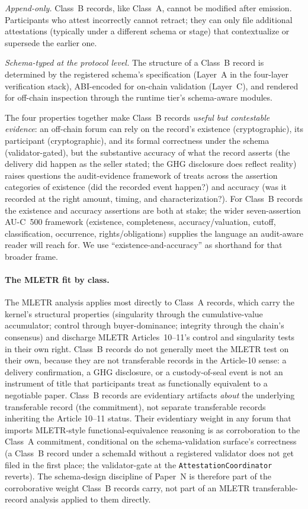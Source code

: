 \documentclass[11pt,a4paper]{article}
\theoremstyle{remark}
\begin{document}
\emph{Append-only.} Class~B records, like Class~A, cannot be
modified after emission. Participants who attest incorrectly
cannot retract; they can only file additional attestations
(typically under a different schema or stage) that contextualize
or supersede the earlier one.

\emph{Schema-typed at the protocol level.} The structure of a
Class~B record is determined by the registered schema's
specification (Layer~A in the four-layer verification stack),
ABI-encoded for on-chain validation (Layer~C), and rendered for
off-chain inspection through the runtime tier's schema-aware
modules.

The four properties together make Class~B records \emph{useful
but contestable evidence}: an off-chain forum can rely on the
record's existence (cryptographic), its participant
(cryptographic), and its formal correctness under the schema
(validator-gated), but the substantive accuracy of what the
record asserts (the delivery did happen as the seller stated;
the GHG disclosure does reflect reality) raises questions the
audit-evidence framework of \citet{aicpa2020auc500} treats
across the assertion categories of existence (did the recorded
event happen?) and accuracy (was it recorded at the right
amount, timing, and characterization?). For Class~B records the
existence and accuracy assertions are both at stake; the wider
seven-assertion AU-C~500 framework (existence, completeness,
accuracy/valuation, cutoff, classification, occurrence,
rights/obligations) supplies the language an audit-aware reader
will reach for. We use ``existence-and-accuracy'' as shorthand
for that broader frame.

\paragraph{The MLETR fit by class.}
The MLETR analysis applies most directly to Class~A records,
which carry the kernel's structural properties (singularity
through the cumulative-value accumulator; control through
buyer-dominance; integrity through the chain's consensus) and
discharge MLETR Articles~10--11's control and singularity tests
in their own right. Class~B records do not generally meet the
MLETR test on their own, because they are not transferable
records in the Article-10 sense: a delivery confirmation, a GHG
disclosure, or a custody-of-seal event is not an instrument of
title that participants treat as functionally equivalent to a
negotiable paper. Class~B records are evidentiary artifacts
\emph{about} the underlying transferable record (the
commitment), not separate transferable records inheriting the
Article 10--11 status. Their evidentiary weight in any forum
that imports MLETR-style functional-equivalence reasoning is as
corroboration to the Class~A commitment, conditional on the
schema-validation surface's correctness (a Class~B record under
a schemaId without a registered validator does not get filed in
the first place; the validator-gate at the
\texttt{AttestationCoordinator} reverts). The schema-design
discipline of Paper~N is therefore part of the corroborative
weight Class~B records carry, not part of an MLETR
transferable-record analysis applied to them directly.
\end{document}
